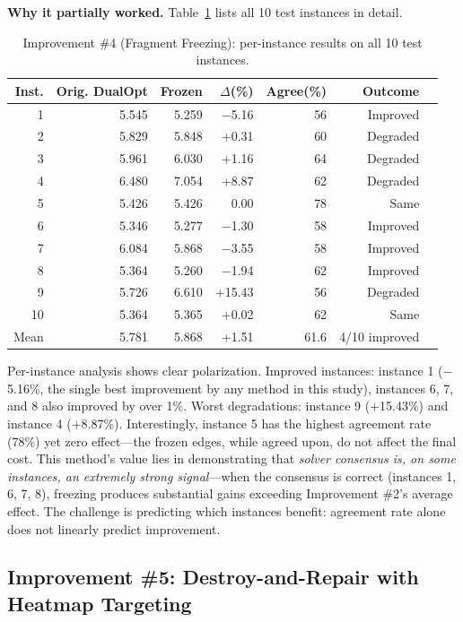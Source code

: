 \documentclass[11pt,a4paper]{article}
\begin{document}
\textbf{Why it partially worked.} Table~\ref{tab:imp4_instances} lists all 10 test instances in detail.

\begin{table}[H]
\centering
\caption{Improvement \#4 (Fragment Freezing): per-instance results on all 10 test instances.}
\label{tab:imp4_instances}
\begin{tabular}{@{}rrrrrrl@{}}
\toprule
Inst. & Orig. DualOpt & Frozen & $\Delta$(\%) & Agree(\%) & Outcome \\
\midrule
1 & 5.545 & 5.259 & $-$5.16 & 56 & Improved \\
2 & 5.829 & 5.848 & +0.31 & 60 & Degraded \\
3 & 5.961 & 6.030 & +1.16 & 64 & Degraded \\
4 & 6.480 & 7.054 & +8.87 & 62 & Degraded \\
5 & 5.426 & 5.426 & 0.00 & 78 & Same \\
6 & 5.346 & 5.277 & $-$1.30 & 58 & Improved \\
7 & 6.084 & 5.868 & $-$3.55 & 58 & Improved \\
8 & 5.364 & 5.260 & $-$1.94 & 62 & Improved \\
9 & 5.726 & 6.610 & +15.43 & 56 & Degraded \\
10 & 5.364 & 5.365 & +0.02 & 62 & Same \\
\midrule
Mean & 5.781 & 5.868 & +1.51 & 61.6 & 4/10 improved \\
\bottomrule
\end{tabular}
\end{table}

Per-instance analysis shows clear polarization. Improved instances: instance 1 ($-$5.16\%, the single best improvement by any method in this study), instances 6, 7, and 8 also improved by over 1\%. Worst degradations: instance 9 ($+$15.43\%) and instance 4 ($+$8.87\%). Interestingly, instance 5 has the highest agreement rate (78\%) yet zero effect---the frozen edges, while agreed upon, do not affect the final cost. This method's value lies in demonstrating that \textit{solver consensus is, on some instances, an extremely strong signal}---when the consensus is correct (instances 1, 6, 7, 8), freezing produces substantial gains exceeding Improvement \#2's average effect. The challenge is predicting which instances benefit: agreement rate alone does not linearly predict improvement.

\subsection{Improvement \#5: Destroy-and-Repair with Heatmap Targeting}
\label{sec:imp5}
\end{document}
